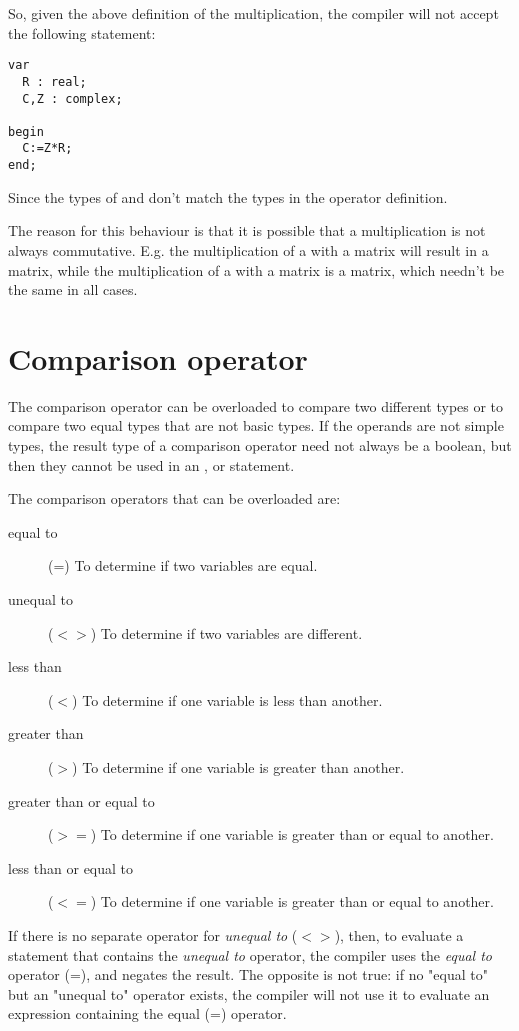 So, given the above definition of the multiplication,
the compiler will not accept the following statement:
\begin{verbatim}
var
  R : real;
  C,Z : complex;

begin
  C:=Z*R;
end;
\end{verbatim}
Since the types of  and  don't match the types in the
operator definition.

The reason for this behaviour is that it is possible that a multiplication
is not always commutative. E.g. the multiplication of a  with a
 matrix will result in a  matrix, while the
multiplication of a  with a  matrix is a 
matrix, which needn't be the same in all cases.

\section{Comparison operator}
The comparison operator can be overloaded to compare two different types
or to compare two equal types that are not basic types. If the operands 
are not simple types, the result type of a comparison operator need not 
always be a boolean, but then they cannot be used in an ,  or  statement.

The comparison operators that can be overloaded are:
\begin{description}
\item[equal to] (=) To determine if two variables are equal.
\item[unequal to] ($<>$) To determine if two variables are different.
\item[less than] ($<$) To determine if one variable is less than another.
\item[greater than] ($>$) To determine if one variable is greater than another.
\item[greater than or equal to] ($>=$) To determine if one variable is greater than
or equal to another.
\item[less than or equal to] ($<=$) To determine if one variable is greater
than or equal to another.
\end{description}

If there is no separate operator for {\em unequal to} ($<>$), then, to evaluate a
statement that contains the {\em unequal to} operator, the compiler uses the
{\em equal to} operator (=), and negates the result. The opposite is not
true: if no "equal to" but an "unequal to" operator exists, the compiler
will not use it to evaluate an expression containing the equal (=) operator. 

